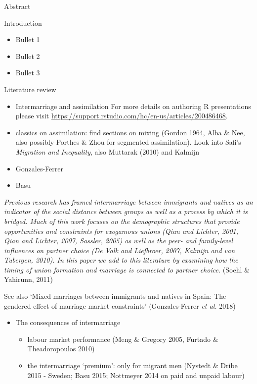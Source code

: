 \documentclass[
  ignorenonframetext,
]{beamer}
\providecommand{\tightlist}{%
  \setlength{\itemsep}{0pt}\setlength{\parskip}{0pt}}\usepackage{longtable,booktabs,array}
\begin{document}
\begin{frame}{Abstract}
\begin{block}{Introduction}
\protect\hypertarget{introduction}{}
\begin{itemize}
\tightlist
\item
  Bullet 1
\item
  Bullet 2
\item
  Bullet 3
\end{itemize}
\end{block}

\begin{block}{Literature review}
\protect\hypertarget{literature-review}{}
\begin{itemize}
\tightlist
\item
  Intermarriage and assimilation For more details on authoring R
  presentations please visit
  \url{https://support.rstudio.com/hc/en-us/articles/200486468}.
\item
  classics on assimilation: find sections on mixing (Gordon 1964, Alba
  \& Nee, also possibly Porthes \& Zhou for segmented assimilation).
  Look into Safi's \emph{Migration and Inequality}, also Muttarak (2010)
  and Kalmijn
\item
  Gonzales-Ferrer
\item
  Basu
\end{itemize}

\emph{Previous research has framed intermarriage between immigrants and
natives as an indicator of the social distance between groups as well as
a process by which it is bridged. Much of this work focuses on the
demographic structures that provide opportunities and constraints for
exogamous unions (Qian and Lichter, 2001, Qian and Lichter, 2007,
Sassler, 2005) as well as the peer- and family-level influences on
partner choice (De Valk and Liefbroer, 2007, Kalmijn and van Tubergen,
2010). In this paper we add to this literature by examining how the
timing of union formation and marriage is connected to partner choice.}
(Soehl \& Yahirunn, 2011)

See also `Mixed marriages between immigrants and natives in Spain: The
gendered effect of marriage market constraints' (Gonzales-Ferrer
\emph{et al.} 2018)

\begin{itemize}
\tightlist
\item
  The consequences of intermarriage

  \begin{itemize}
  \tightlist
  \item
    labour market performance (Meng \& Gregory 2005, Furtado \&
    Theadoropoulos 2010)
  \item
    the intermarriage `premium': only for migrant men (Nystedt \& Dribe
    2015 - Sweden; Basu 2015; Nottmeyer 2014 on paid and unpaid labour)
  \end{itemize}
\end{itemize}


\end{block}
\end{frame}
\end{document}

